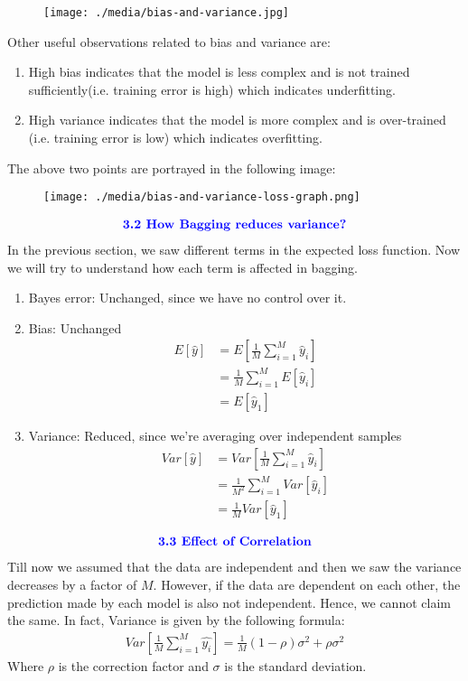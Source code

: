 \documentclass{homework}
\begin{document}
\begin{figure}[!ht]
    \centering
    \texttt{[image: ./media/bias-and-variance.jpg]}
\end{figure}
\newpage
Other useful observations related to bias and variance are:
\begin{enumerate}
    \item High bias indicates that the model is less complex and is not trained sufficiently(i.e. training error is high) which indicates underfitting.
    \item High variance indicates that the model is more complex and is over-trained (i.e. training error is low) which indicates overfitting.
\end{enumerate}
The above two points are portrayed in the following image:
\begin{figure}[!ht]
    \centering
    \texttt{[image: ./media/bias-and-variance-loss-graph.png]}
\end{figure}
\begin{align*}
    \textcolor{blue}{ \text{{\textbf{3.2 How Bagging reduces variance?}}}}
 \end{align*}
In the previous section, we saw different terms in the expected loss function. Now we will try to understand how each term is affected in bagging.
\begin{enumerate}
    \item Bayes error: Unchanged, since we have no control over it.
    \item Bias: Unchanged
        \begin{align*}
            E[\hat{y}] &= E[\frac{1}{M}\sum_{i=1}^{M}\hat{y}_i] \\
                &= \frac{1}{M}\sum_{i=1}^ME[\hat{y}_i] \\
                &= E[\hat{y}_1]
        \end{align*}
    \item Variance: Reduced, since we're averaging over independent
    samples
        \begin{align*}
            Var[\hat{y}] &= Var[\frac{1}{M}\sum_{i=1}^{M}\hat{y}_i] \\
                &= \frac{1}{M^2}\sum_{i=1}^{M} Var[\hat{y}_i] \\
                &= \frac{1}{M}Var[\hat{y}_1]
        \end{align*}
\end{enumerate}
\begin{align*}
    \textcolor{blue}{ \text{{\textbf{3.3 Effect of Correlation}}}}
 \end{align*}
Till now we assumed that the data are independent and then we saw the variance decreases by a factor of $M$. However, if the data are dependent on each other, the prediction made by each model is also not independent. Hence, we cannot claim the same. In fact, Variance is given by the following formula:
\begin{align*}
    Var[\frac{1}{M}\sum_{i=1}^{M}\hat{y_i}] = \frac{1}{M}(1-\rho)\sigma^2 + \rho\sigma^2
\end{align*}
Where $\rho$ is the correction factor and $\sigma$ is the standard deviation.
\end{document}
